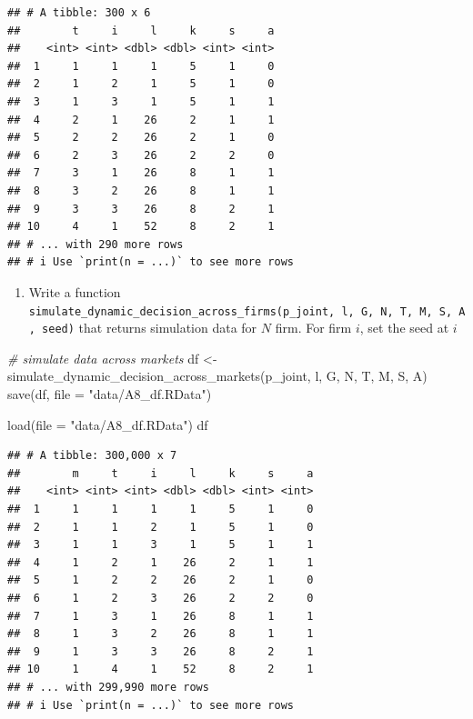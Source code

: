 \documentclass[
]{book}
\newenvironment{Shaded}{\begin{snugshade}}{\end{snugshade}}
\newcommand{\AttributeTok}[1]{\textcolor[rgb]{0.77,0.63,0.00}{#1}}
\newcommand{\CommentTok}[1]{\textcolor[rgb]{0.56,0.35,0.01}{\textit{#1}}}
\newcommand{\FunctionTok}[1]{\textcolor[rgb]{0.00,0.00,0.00}{#1}}
\newcommand{\NormalTok}[1]{#1}
\newcommand{\OtherTok}[1]{\textcolor[rgb]{0.56,0.35,0.01}{#1}}
\newcommand{\StringTok}[1]{\textcolor[rgb]{0.31,0.60,0.02}{#1}}
\providecommand{\tightlist}{%
  \setlength{\itemsep}{0pt}\setlength{\parskip}{0pt}}
\begin{document}
\begin{verbatim}
## # A tibble: 300 x 6
##        t     i     l     k     s     a
##    <int> <int> <dbl> <dbl> <int> <int>
##  1     1     1     1     5     1     0
##  2     1     2     1     5     1     0
##  3     1     3     1     5     1     1
##  4     2     1    26     2     1     1
##  5     2     2    26     2     1     0
##  6     2     3    26     2     2     0
##  7     3     1    26     8     1     1
##  8     3     2    26     8     1     1
##  9     3     3    26     8     2     1
## 10     4     1    52     8     2     1
## # ... with 290 more rows
## # i Use `print(n = ...)` to see more rows
\end{verbatim}

\begin{enumerate}
\def\labelenumi{\arabic{enumi}.}
\setcounter{enumi}{12}
\tightlist
\item
  Write a function \texttt{simulate\_dynamic\_decision\_across\_firms(p\_joint,\ l,\ G,\ N,\ T,\ M,\ S,\ A,\ seed)} that returns simulation data for \(N\) firm. For firm \(i\), set the seed at \(i\)
\end{enumerate}

\begin{Shaded}
\begin{Highlighting}[]
\CommentTok{\# simulate data across markets}
\NormalTok{df }\OtherTok{\textless{}{-}} \FunctionTok{simulate\_dynamic\_decision\_across\_markets}\NormalTok{(p\_joint, l, G, N, T, M, S, A)}
\FunctionTok{save}\NormalTok{(df, }\AttributeTok{file =} \StringTok{"data/A8\_df.RData"}\NormalTok{)}
\end{Highlighting}
\end{Shaded}

\begin{Shaded}
\begin{Highlighting}[]
\FunctionTok{load}\NormalTok{(}\AttributeTok{file =} \StringTok{"data/A8\_df.RData"}\NormalTok{)}
\NormalTok{df}
\end{Highlighting}
\end{Shaded}

\begin{verbatim}
## # A tibble: 300,000 x 7
##        m     t     i     l     k     s     a
##    <int> <int> <int> <dbl> <dbl> <int> <int>
##  1     1     1     1     1     5     1     0
##  2     1     1     2     1     5     1     0
##  3     1     1     3     1     5     1     1
##  4     1     2     1    26     2     1     1
##  5     1     2     2    26     2     1     0
##  6     1     2     3    26     2     2     0
##  7     1     3     1    26     8     1     1
##  8     1     3     2    26     8     1     1
##  9     1     3     3    26     8     2     1
## 10     1     4     1    52     8     2     1
## # ... with 299,990 more rows
## # i Use `print(n = ...)` to see more rows
\end{verbatim}
\end{document}
